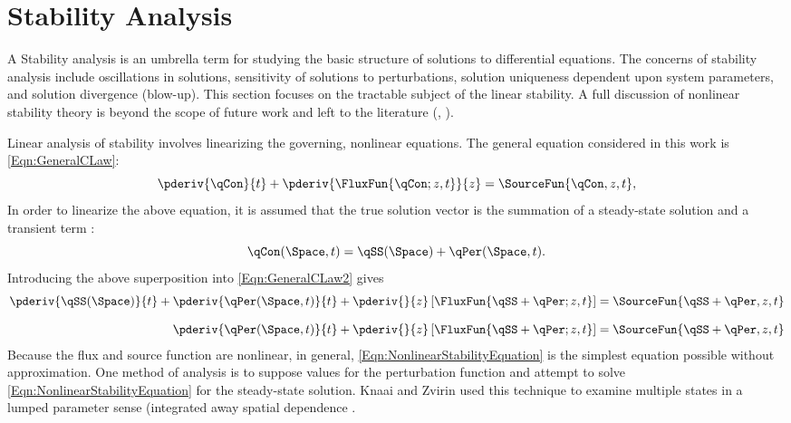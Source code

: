 \section{Stability Analysis}\label{Section:StabilityTheory}A
Stability analysis is an umbrella term for studying the basic structure of solutions to differential equations.
The concerns of stability analysis include oscillations in solutions, sensitivity of solutions to perturbations, solution uniqueness dependent upon system parameters, and solution divergence (blow-up).
This section focuses on the tractable subject of the linear stability.
A full discussion of nonlinear stability theory is beyond the scope of future work and left to the literature (\eg, \cite{guckenheimer_nonlinear_1983,galaktionov_stability_2004}).


Linear analysis of stability involves linearizing the governing, nonlinear equations.
The general equation considered in this work is \cref{Eqn:GeneralCLaw}:
\begin{equation}
    \pderiv{\qCon}{t} + \pderiv{\FluxFun{\qCon; z,t}}{z} = \SourceFun{\qCon,z,t},
\label{Eqn:GeneralCLaw2}
\end{equation}
In order to linearize the above equation, it is assumed that the true solution vector \qCon is the summation of a steady-state solution \qSS and a transient term \qPer:
\begin{equation}
    \qCon(\Space,t) = \qSS(\Space) + \qPer(\Space,t).
\end{equation}
Introducing the above superposition into \cref{Eqn:GeneralCLaw2} gives
\begin{align}
    \pderiv{\qSS(\Space)}{t} + \pderiv{\qPer(\Space,t)}{t}   + \pderiv{}{z} \left[\FluxFun{\qSS + \qPer; z,t}\right] &= \SourceFun{\qSS + \qPer,z,t} \\[0.8em]
                               \pderiv{\qPer(\Space,t)}{t}  + \pderiv{}{z} \left[\FluxFun{\qSS + \qPer; z,t}\right] &= \SourceFun{\qSS + \qPer,z,t} 
                            \label{Eqn:NonlinearStabilityEquation}
\end{align}
Because the flux and source function are nonlinear, in general, \cref{Eqn:NonlinearStabilityEquation} is the simplest equation possible without approximation.
One method of analysis is to suppose values for the perturbation function and attempt to solve \cref{Eqn:NonlinearStabilityEquation} for the steady-state solution.  
Knaai and Zvirin used this technique to examine multiple states in a lumped parameter sense (integrated away spatial dependence \cite{knaani_bifurcation_1993}.

